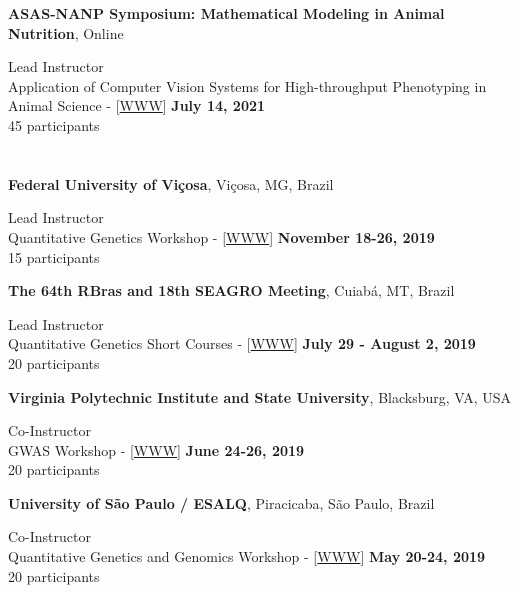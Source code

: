 \documentclass[margin,line,10pt]{res}
\begin{document}
\begin{resume}
{\bf ASAS-NANP Symposium: Mathematical Modeling in Animal Nutrition}, Online
\vspace{.01pt}

Lead Instructor  \\
Application of Computer Vision Systems for High-throughput Phenotyping in Animal Science - [\textcolor{blue}{\href{http://morotalab.org/guestlectures/2020/NANP/handson/PreASAS.pdf}{WWW}}]
\hfill {\bf July 14, 2021} \\
45 participants




\section{}

{\bf Federal University of Vi\c cosa}, Vi\c cosa, MG, Brazil
\vspace{.01pt}

Lead Instructor  \\
Quantitative Genetics Workshop - [\textcolor{blue}{\href{http://morotalab.org/UFV2019/UFV2019.html}{WWW}}]
\hfill {\bf November 18-26, 2019} \\
15 participants


{\bf The 64th RBras and 18th SEAGRO Meeting}, Cuiab{\'a}, MT, Brazil
\vspace{.01pt}

Lead Instructor  \\
    Quantitative Genetics Short Courses - [\textcolor{blue}{\href{http://morotalab.org/RBras2019/RBras2019.html}{WWW}}]
\hfill {\bf  July 29 - August 2, 2019} \\
20 participants 


{\bf Virginia Polytechnic Institute and State University}, Blacksburg, VA, USA
\vspace{.01pt}

Co-Instructor  \\
GWAS Workshop - [\textcolor{blue}{\href{http://morotalab.org/VTGWAS2019/VTGWAS2019.html}{WWW}}]
\hfill {\bf June 24-26, 2019} \\
20 participants 


{\bf University of S\~{a}o Paulo / ESALQ}, Piracicaba, S\~{a}o Paulo, Brazil
\vspace{.01pt}

Co-Instructor  \\
Quantitative Genetics and Genomics Workshop - [\textcolor{blue}{\href{http://morotalab.org/ESALQ2019/ESALQ2019.html}{WWW}}]
\hfill {\bf May 20-24, 2019} \\
20 participants



\end{resume}
\end{document}
